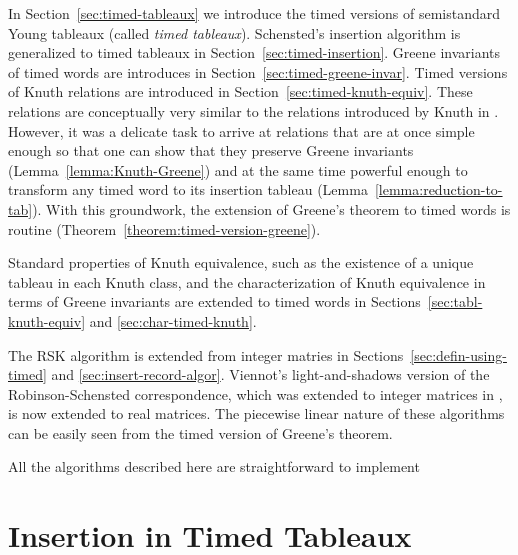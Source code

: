 \documentclass[10pt]{amsproc}
\theoremstyle{definition}
\theoremstyle{remark}
\begin{document}
In Section~\ref{sec:timed-tableaux} we introduce the timed versions of semistandard Young tableaux (called \emph{timed tableaux}). 
Schensted's insertion algorithm is generalized to timed tableaux in Section~\ref{sec:timed-insertion}.
Greene invariants of timed words are introduces in Section~\ref{sec:timed-greene-invar}.
Timed versions of Knuth relations are introduced in Section~\ref{sec:timed-knuth-equiv}. 
These relations are conceptually very similar to the relations introduced by Knuth in \cite{knuth}. 
However, it was a delicate task to arrive at relations that are at once simple enough so that one can show that they preserve Greene invariants (Lemma~\ref{lemma:Knuth-Greene}) and at the same time powerful enough to transform any timed word to its insertion tableau (Lemma~\ref{lemma:reduction-to-tab}).
With this groundwork, the extension of Greene's theorem to timed words is routine (Theorem~\ref{theorem:timed-version-greene}).

Standard properties of Knuth equivalence, such as the existence of a unique tableau in each Knuth class, and the characterization of Knuth equivalence in terms of Greene invariants are extended to timed words in Sections~\ref{sec:tabl-knuth-equiv} and \ref{sec:char-timed-knuth}.

The RSK algorithm \cite{knuth} is extended from integer matries in Sections~\ref{sec:defin-using-timed} and \ref{sec:insert-record-algor}.
Viennot's light-and-shadows version of the Robinson-Schensted correspondence, which was extended to integer matrices in \cite{rtcv}, is now extended to real matrices.
The piecewise linear nature of these algorithms can be easily seen from the timed version of Greene's theorem.

All the algorithms described here are straightforward to implement 
\section{Insertion in Timed Tableaux}
\label{sec:insertion}
\end{document}
